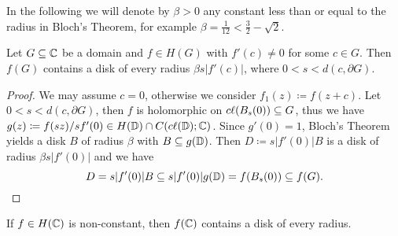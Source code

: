 In the following we will denote by $\beta > 0$ any constant less than or equal to the radius in Bloch's Theorem, for example $\beta = \frac{1}{12} < \frac{3}{2} - \sqrt{2}$.

\begin{corollary} \label{cor:bloch-domain}
    Let $G \subseteq \mathbb{C}$ be a domain and $f \in H(G)$ with $f'(c) \neq 0$ for some $c \in G$. Then $f(G)$ contains a disk of every radius $\beta s \vert f'(c) \vert$, where $0 < s < d(c, \partial G)$.
\end{corollary}

\begin{proof}
    We may assume $c = 0$, otherwise we consider $f_1(z) \coloneqq f(z+c)$. Let $0 < s < d(c, \partial G)$, then $f$ is holomorphic on $c\ell({B_s(0)}) \subseteq G$, thus we have $g(z) \coloneqq f(sz) / sf'(0) \in H(\mathbb{D}) \cap C(c\ell({\mathbb{D}}); \mathbb{C})$. Since $g'(0) = 1$, Bloch's Theorem yields a disk $B$ of radius $\beta$ with $B \subseteq g(\mathbb{D})$. Then $D \coloneqq s \vert f'(0) \vert B$ is a disk of radius $\beta s \vert f'(0) \vert$ and we have
    \begin{equation*}
        D = s \vert f'(0) \vert B \subseteq s \vert f'(0) \vert g(\mathbb{D}) = f(B_s(0)) \subseteq f(G). \qedhere
    \end{equation*}
\end{proof}

\begin{corollary} \label{cor:bloch-entire}
    If $f \in H(\mathbb{C})$ is non-constant, then $f(\mathbb{C})$ contains a disk of every radius.
\end{corollary}
